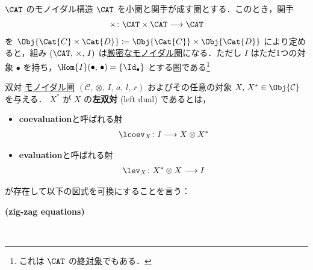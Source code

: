 \documentclass[TQFT_main]{subfiles}
\begin{document}
    \begin{myexample}[label=ex:Cat-monidal]{$\CAT$ のモノイダル構造}
        $\CAT$ を小圏と関手が成す圏とする．このとき，関手
        \begin{align}
            \times \colon \CAT \times \CAT \lto \CAT
        \end{align}
        を $\Obj{\Cat{C} \times \Cat{D}} \coloneqq \Obj{\Cat{C}} \times \Obj{\Cat{D}}$ により定めると，組み $(\CAT,\, \times,\, I)$ は\hyperref[redef:monoidal]{厳密なモノイダル圏}になる．ただし $I$ はただ1つの対象 $\bullet$ を持ち，$\Hom{I}(\bullet,\,\bullet) = \{\Id_{\bullet}\}$ とする圏である\footnote{これは $\CAT$ の\hyperref[def:colim]{終対象}でもある．}
    \end{myexample}


\begin{mydef}[label=redef:dual,breakable]{双対}
    \hyperref[def:monoidal-category]{モノイダル圏} $(\mathcal{C},\, \otimes,\, I,\, a,\, l,\, r)$ およびその任意の対象 $X,\, X^* \in \Obj{\mathcal{C}}$ を与える．
    $X^*$ が $X$ の\textbf{左双対} (left dual) であるとは，
    \begin{itemize}
        \item \textbf{coevaluation}と呼ばれる射
        \begin{align}
            \lcoev_X \colon I \lto X \otimes X^*
        \end{align}
        \item \textbf{evaluation}と呼ばれる射
        \begin{align}
            \lev_X \colon X^* \otimes X \lto I
        \end{align}
    \end{itemize}
    が存在して以下の図式を可換にすることを言う：
    \begin{description}
        \item[\textbf{(zig-zag equations)}]　
        
        \begin{center}
        \end{center}


\end{description}
\end{mydef}
\end{document}
